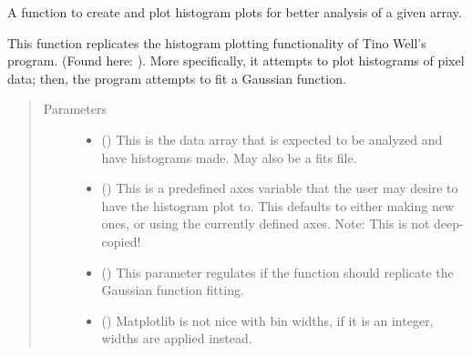 \documentclass[letterpaper,10pt,english]{sphinxmanual}
\begin{document}
\begin{fulllineitems}
\label{\detokenize{python_docstrings/IfA_Smeargle.oscar.histograms:IfA_Smeargle.oscar.histograms.plot_array_histogram}}
A function to create and plot histogram plots for better analysis of
a given array.

This function replicates the histogram plotting functionality of Tino
Well’s program. (Found here: ). More
specifically, it attempts to plot histograms of pixel data; then, the
program attempts to fit a Gaussian function.
\begin{quote}\begin{description}
\item[{Parameters}] \leavevmode\begin{itemize}
\item {} 
 () \textendash{} This is the data array that is expected to be analyzed and have
histograms made. May also be a fits file.

\item {} 
 (\sphinxstyleliteralemphasis{\sphinxupquote{ (}}\sphinxstyleliteralemphasis{\sphinxupquote{)}}) \textendash{} This is a predefined axes variable that the user may desire to have
the histogram plot to. This defaults to either making new ones, or
using the currently defined axes. Note: This is not deep-copied!

\item {} 
 (\sphinxstyleliteralemphasis{\sphinxupquote{ (}}\sphinxstyleliteralemphasis{\sphinxupquote{)}}) \textendash{} This parameter regulates if the function should replicate the
Gaussian function fitting.

\item {} 
 (\sphinxstyleliteralemphasis{\sphinxupquote{ (}}\sphinxstyleliteralemphasis{\sphinxupquote{)}}) \textendash{} Matplotlib is not nice with bin widths, if it is an integer, widths
are applied instead.


\end{itemize}
\end{description}
\end{quote}
\end{fulllineitems}
\end{document}
